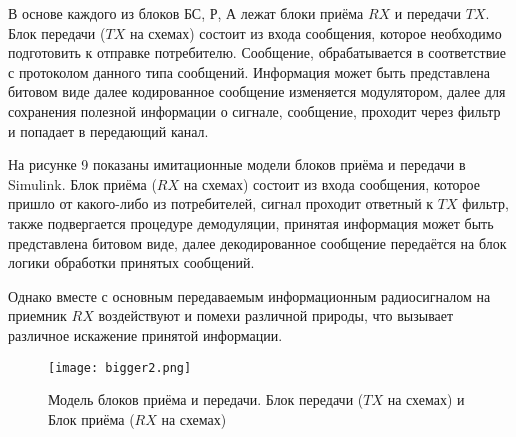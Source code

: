 	
\begin{onehalfspace}	
	
	 В основе каждого из блоков БС, Р, А лежат блоки приёма $RX$ и передачи $TX$. Блок передачи ($TX$ на схемах) состоит из входа сообщения, которое необходимо подготовить к отправке потребителю. Сообщение, обрабатывается в соответствие с протоколом данного типа сообщений. Информация может быть представлена битовом виде далее кодированное сообщение изменяется модулятором, далее для сохранения полезной информации о сигнале, сообщение, проходит через фильтр и попадает в передающий канал.

  На рисунке 9 показаны имитационные модели блоков приёма и передачи в Simulink. Блок приёма ($RX$ на схемах) состоит из входа сообщения, которое пришло от какого-либо из потребителей, сигнал проходит ответный к $TX$ фильтр, также подвергается процедуре демодуляции, принятая информация может быть представлена битовом виде, далее декодированное сообщение передаётся на блок логики обработки принятых сообщений.

  Однако вместе с основным передаваемым информационным радиосигналом на приемник $RX$ воздействуют и помехи различной природы, что вызывает различное искажение принятой информации.

\end{onehalfspace}	


\begin{center}
		\begin{figure}[h!]
			\centering
			\texttt{[image: bigger2.png]}
			\caption{Модель блоков приёма и передачи. Блок передачи ($TX$ на схемах) и  Блок приёма ($RX$ на схемах)}
			\label{fig:model9}
		\end{figure}
	\end{center}





